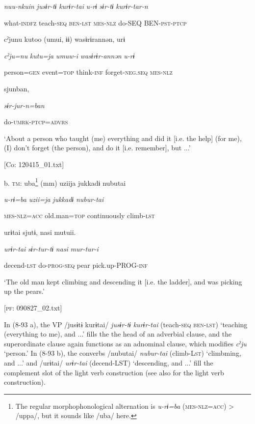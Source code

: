       \textit{nuu-nkuin}  \textit{jusɨr-tɨ}  \textit{kurɨr-tai}  \textit{u-rɨ}  \textit{sɨr-tɨ}  \textit{kurɨr-tar-n}

      what-\textsc{indfz}  teach-\textsc{seq}  \textsc{ben}-\textsc{lst}  \textsc{mes}-\textsc{nlz}  do-SEQ  BEN-\textsc{pst}-\textsc{ptcp}

      cˀjunu  kutoo  (umui,  ɨɨ)  wasɨrɨrannən,  urɨ

      \textit{cˀju=nu}  \textit{kutu=ja}  \textit{umuw-i}    \textit{wasɨrɨr-annən}  \textit{u-rɨ}

      person=\textsc{gen}  event=\textsc{top}  think-\textsc{inf}    forget-\textsc{neg}.\textsc{seq}  \textsc{mes}-\textsc{nlz}

      sjunban,

      \textit{sɨr-jur-n=ban}

      do-\textsc{umrk}-\textsc{ptcp}=\textsc{advrs}

      ‘About a person who taught (me) everything and did it [i.e. the help] (for me), (I) don’t forget (the person), and do it [i.e. remember], but ...’

      [Co: 120415\_01.txt]

  b.  \textsc{tm}:  uba\footnote{The regular morphophonological alternation is \textit{u-rɨ=ba} (\textsc{mes}-\textsc{nlz}=\textsc{acc}) > /uppa/, but it sounds like /uba/ here.}  (mm)  uziija  jukkadɨ  nubutai

      \textit{u-rɨ=ba}    \textit{uzii=ja}  \textit{jukkadɨ}  \textit{nubur-tai}

      \textsc{mes}-\textsc{nlz}=\textsc{acc}    old.man=\textsc{top}  continuously  climb-\textsc{lst}

      urɨtai  sjutɨ,  nasi  mutuii.

      \textit{urɨr-tai}  \textit{sɨr-tur-tɨ}  \textit{nasi}  \textit{mur-tur-i}

      decend-\textsc{lst}  do-\textsc{prog}-\textsc{seq}  pear  pick.up-PROG-\textsc{inf}

      ‘The old man kept climbing and descending it [i.e. the ladder], and was picking up the pears.’

      [\textsc{pf}: 090827\_02.txt]

In (8-93 a), the VP /jusɨtɨ kurɨtai/ \textit{jusɨr-tɨ} \textit{kurɨr-tai} (teach-\textsc{seq} \textsc{ben}-\textsc{lst}) ‘teaching (everything to me), and ...’ fills the the head of an adverbial clause, and the superordinate clause again functions as an adnominal clause, which modifies \textit{cˀju} ‘person.’ In (8-93 b), the converbs /nubutai/ \textit{nubur-tai} (climb-L\textsc{st}) ‘climbming, and ...’ and /urɨtai/ \textit{urɨr-tai} (decend-LST) ‘descending, and ...’ fill the complement slot of the light verb construction (see also  for the light verb construction).

